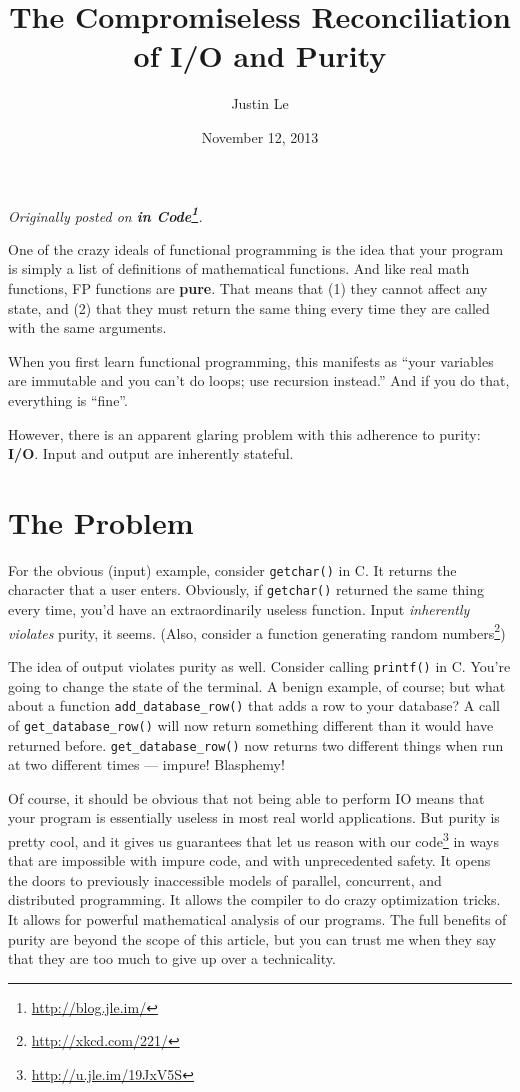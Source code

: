 \documentclass[]{article}
\title{The Compromiseless Reconciliation of I/O and Purity}
\author{Justin Le}
\date{November 12, 2013}
\renewcommand{\href}[2]{#2\footnote{\url{#1}}}
\begin{document}
\maketitle

\emph{Originally posted on \textbf{\href{http://blog.jle.im/}{in
Code}}.}

One of the crazy ideals of functional programming is the idea that your
program is simply a list of definitions of mathematical functions. And
like real math functions, FP functions are \textbf{pure}. That means
that (1) they cannot affect any state, and (2) that they must return the
same thing every time they are called with the same arguments.

When you first learn functional programming, this manifests as ``your
variables are immutable and you can't do loops; use recursion instead.''
And if you do that, everything is ``fine''.

However, there is an apparent glaring problem with this adherence to
purity: \textbf{I/O}. Input and output are inherently stateful.

\section{The Problem}\label{the-problem}

For the obvious (input) example, consider \texttt{getchar()} in C. It
returns the character that a user enters. Obviously, if
\texttt{getchar()} returned the same thing every time, you'd have an
extraordinarily useless function. Input \emph{inherently violates}
purity, it seems. (Also, consider a \href{http://xkcd.com/221/}{function
generating random numbers})

The idea of output violates purity as well. Consider calling
\texttt{printf()} in C. You're going to change the state of the
terminal. A benign example, of course; but what about a function
\texttt{add\_database\_row()} that adds a row to your database? A call
of \texttt{get\_database\_row()} will now return something different
than it would have returned before. \texttt{get\_database\_row()} now
returns two different things when run at two different times --- impure!
Blasphemy!

Of course, it should be obvious that not being able to perform IO means
that your program is essentially useless in most real world
applications. But purity is pretty cool, and it gives us guarantees that
let us \href{http://u.jle.im/19JxV5S}{reason with our code} in ways that
are impossible with impure code, and with unprecedented safety. It opens
the doors to previously inaccessible models of parallel, concurrent, and
distributed programming. It allows the compiler to do crazy optimization
tricks. It allows for powerful mathematical analysis of our programs.
The full benefits of purity are beyond the scope of this article, but
you can trust me when they say that they are too much to give up over a
technicality.
\end{document}
